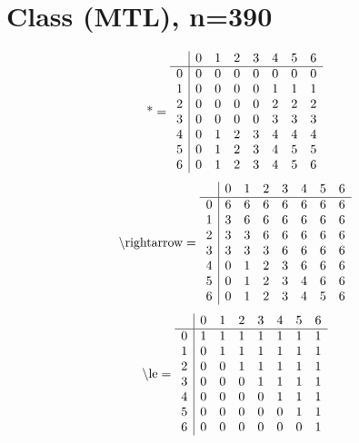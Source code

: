 \documentclass[11pt]{article}
\begin{document}
\section{Class (MTL), n=390}
\[\text{*} = 
\begin{array}{r | r r r r r r r}
 & 0 & 1 & 2 & 3 & 4 & 5 & 6 \\ \hline
0 & 0 & 0 & 0 & 0 & 0 & 0 & 0 \\
1 & 0 & 0 & 0 & 0 & 1 & 1 & 1 \\
2 & 0 & 0 & 0 & 0 & 2 & 2 & 2 \\
3 & 0 & 0 & 0 & 0 & 3 & 3 & 3 \\
4 & 0 & 1 & 2 & 3 & 4 & 4 & 4 \\
5 & 0 & 1 & 2 & 3 & 4 & 5 & 5 \\
6 & 0 & 1 & 2 & 3 & 4 & 5 & 6 \\
\end{array}
\]
\[\text{\textbackslash rightarrow} = 
\begin{array}{r | r r r r r r r}
 & 0 & 1 & 2 & 3 & 4 & 5 & 6 \\ \hline
0 & 6 & 6 & 6 & 6 & 6 & 6 & 6 \\
1 & 3 & 6 & 6 & 6 & 6 & 6 & 6 \\
2 & 3 & 3 & 6 & 6 & 6 & 6 & 6 \\
3 & 3 & 3 & 3 & 6 & 6 & 6 & 6 \\
4 & 0 & 1 & 2 & 3 & 6 & 6 & 6 \\
5 & 0 & 1 & 2 & 3 & 4 & 6 & 6 \\
6 & 0 & 1 & 2 & 3 & 4 & 5 & 6 \\
\end{array}
\]
\[\text{\textbackslash le} = 
\begin{array}{r | r r r r r r r}
 & 0 & 1 & 2 & 3 & 4 & 5 & 6 \\ \hline
0 & 1 & 1 & 1 & 1 & 1 & 1 & 1 \\
1 & 0 & 1 & 1 & 1 & 1 & 1 & 1 \\
2 & 0 & 0 & 1 & 1 & 1 & 1 & 1 \\
3 & 0 & 0 & 0 & 1 & 1 & 1 & 1 \\
4 & 0 & 0 & 0 & 0 & 1 & 1 & 1 \\
5 & 0 & 0 & 0 & 0 & 0 & 1 & 1 \\
6 & 0 & 0 & 0 & 0 & 0 & 0 & 1 \\
\end{array}
\]
\end{document}
